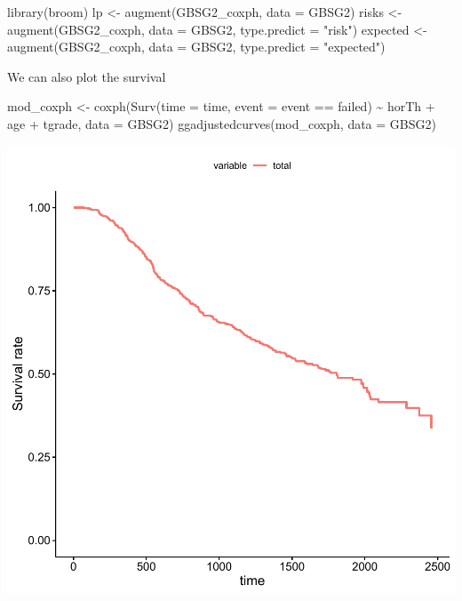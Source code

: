 \documentclass[
]{book}
\makeatletter
\newenvironment{Shaded}{\begin{snugshade}}{\end{snugshade}}
\newcommand{\AttributeTok}[1]{\textcolor[rgb]{0.61,0.61,0.61}{#1}}
\newcommand{\FunctionTok}[1]{\textcolor[rgb]{0,0,0}{#1}}
\newcommand{\NormalTok}[1]{#1}
\newcommand{\OtherTok}[1]{\textcolor[rgb]{0.37,0.37,0.37}{#1}}
\newcommand{\SpecialCharTok}[1]{\textcolor[rgb]{0,0,0}{#1}}
\newcommand{\StringTok}[1]{\textcolor[rgb]{0.5,0.5,0.5}{#1}}
\newenvironment{kframe}{%
\medskip{}
\setlength{\fboxsep}{.8em}
 \def\at@end@of@kframe{}%
 \ifinner\ifhmode%
  \def\at@end@of@kframe{\end{minipage}}%
  \begin{minipage}{\columnwidth}%
 \fi\fi%
 \def\FrameCommand##1{\hskip\@totalleftmargin \hskip-\fboxsep
 \colorbox{shadecolor}{##1}\hskip-\fboxsep
     \hskip-\linewidth \hskip-\@totalleftmargin \hskip\columnwidth}%
 \MakeFramed {\advance\hsize-\width
   \@totalleftmargin\z@ \linewidth\hsize
   \@setminipage}}%
 {\par\unskip\endMakeFramed%
 \at@end@of@kframe}
\renewenvironment{Shaded}{\begin{kframe}}{\end{kframe}}
\makeatother
\begin{document}
\begin{Shaded}
\begin{Highlighting}[]
\FunctionTok{library}\NormalTok{(broom)}
\NormalTok{lp }\OtherTok{\textless{}{-}} \FunctionTok{augment}\NormalTok{(GBSG2\_coxph, }\AttributeTok{data =}\NormalTok{ GBSG2)}
\NormalTok{risks }\OtherTok{\textless{}{-}} \FunctionTok{augment}\NormalTok{(GBSG2\_coxph, }\AttributeTok{data =}\NormalTok{ GBSG2, }\AttributeTok{type.predict =} \StringTok{"risk"}\NormalTok{)}
\NormalTok{expected }\OtherTok{\textless{}{-}} \FunctionTok{augment}\NormalTok{(GBSG2\_coxph, }\AttributeTok{data =}\NormalTok{ GBSG2, }\AttributeTok{type.predict =} \StringTok{"expected"}\NormalTok{)}
\end{Highlighting}
\end{Shaded}

We can also plot the survival

\begin{Shaded}
\begin{Highlighting}[]
\NormalTok{mod\_coxph }\OtherTok{\textless{}{-}} \FunctionTok{coxph}\NormalTok{(}\FunctionTok{Surv}\NormalTok{(}\AttributeTok{time =}\NormalTok{ time, }\AttributeTok{event =}\NormalTok{ event }\SpecialCharTok{==} \StringTok{\textquotesingle{}failed\textquotesingle{}}\NormalTok{) }\SpecialCharTok{\textasciitilde{}}\NormalTok{ horTh }\SpecialCharTok{+}\NormalTok{ age }\SpecialCharTok{+}\NormalTok{ tgrade, }\AttributeTok{data =}\NormalTok{ GBSG2)}
\FunctionTok{ggadjustedcurves}\NormalTok{(mod\_coxph, }\AttributeTok{data =}\NormalTok{ GBSG2)}
\end{Highlighting}
\end{Shaded}

\begin{center}\includegraphics[width=0.7\linewidth,keepaspectratio]{Multivariable_Data_Analysis_files/figure-latex/unnamed-chunk-189-1} \end{center}
\end{document}
